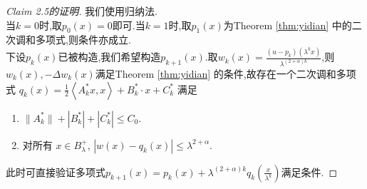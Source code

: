 \documentclass[12pt,A4paper,reqno]{amsart}
\numberwithin{equation}{section}
\theoremstyle{plain}
\theoremstyle{plain}
\theoremstyle{plain}
\numberwithin{equation}{section}
\theoremstyle{remark}
\begin{document}
\begin{proof}[Claim 2.5的证明]
	我们使用归纳法.\\当$k=0$时,取$p_0(x)=0$即可.当$k=1$时,取$p_1(x)$为Theorem \ref{thm:yidian} 中的二次调和多项式,则条件亦成立.\\
	下设$p_k(x)$已被构造,我们希望构造$p_{k+1}(x)$.取$w_k(x)=\frac{(u-p_{k})(\lambda^{k} x)}{\lambda^{(2+\alpha) k}}$,则$w_k(x),-\Delta w_k(x)$满足Theorem \ref{thm:yidian} 的条件,故存在一个二次调和多项式
	$q_{k}(x)=\frac{1}{2}\left\langle A_{k}^{*} x, x\right\rangle+ B_{k}^{*} \cdot x+C_{k}^{*}$
	满足
		\begin{enumerate}
		\item
		 $\|A_{k}^{*}\|+|B_{k}^{*}|+|C_{k}^{*}| \leqslant C_{0}$.
		\item 对所有 $x \in B_{\lambda}^{+}$, $|w(x)-q_{k}(x)| \leqslant \lambda^{2+\alpha}$.
	\end{enumerate}
	此时可直接验证多项式$p_{k+1}(x)=p_k(x)+\lambda^{(2+\alpha)k}q_k(\frac{x}{\lambda^k})$满足条件.
\end{proof}
\end{document}
